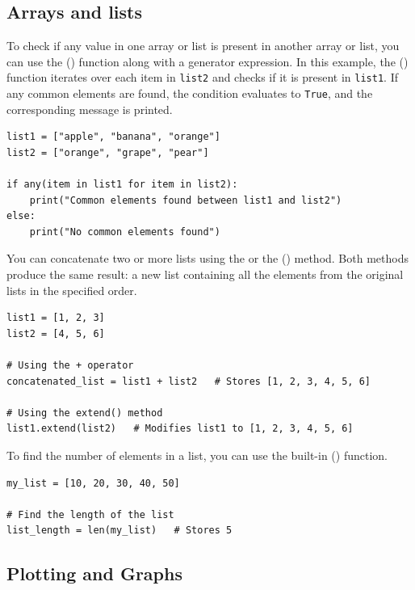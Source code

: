 \subsection{Arrays and lists}

To check if any value in one array or list is present in another array or list, you can use the () function along with a generator expression. In this example, the () function iterates over each item in \texttt{list2} and checks if it is present in \texttt{list1}. If any common elements are found, the condition evaluates to \texttt{True}, and the corresponding message is printed.
\begin{lstlisting}
list1 = ["apple", "banana", "orange"]
list2 = ["orange", "grape", "pear"]

if any(item in list1 for item in list2):
    print("Common elements found between list1 and list2")
else:
    print("No common elements found")
\end{lstlisting}
 
You can concatenate two or more lists using the  or the () method. Both methods produce the same result: a new list containing all the elements from the original lists in the specified order.
\begin{lstlisting}
list1 = [1, 2, 3]
list2 = [4, 5, 6]

# Using the + operator
concatenated_list = list1 + list2   # Stores [1, 2, 3, 4, 5, 6]

# Using the extend() method
list1.extend(list2)   # Modifies list1 to [1, 2, 3, 4, 5, 6]
\end{lstlisting}

To find the number of elements in a list, you can use the built-in () function.
\begin{lstlisting}
my_list = [10, 20, 30, 40, 50]

# Find the length of the list
list_length = len(my_list)   # Stores 5
\end{lstlisting}








\subsection{Plotting and Graphs}

